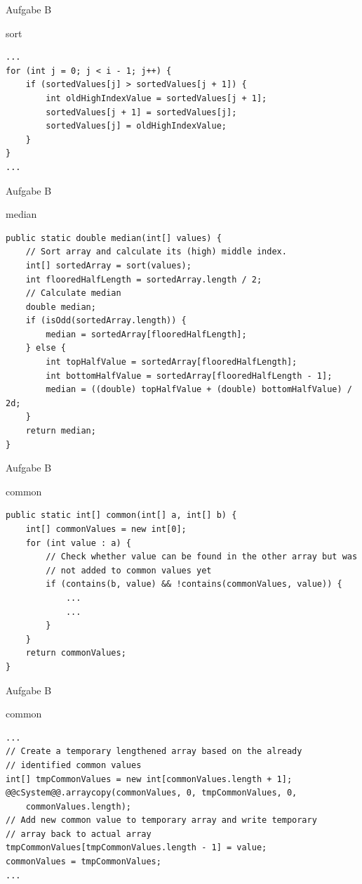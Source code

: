 \documentclass[aspectratio=169]{beamer}
\begin{document}
\begin{frame}[fragile]{Aufgabe B}
  \begin{block}{sort}
    \begin{lstlisting}
...
for (int j = 0; j < i - 1; j++) {
    if (sortedValues[j] > sortedValues[j + 1]) {
        int oldHighIndexValue = sortedValues[j + 1];
        sortedValues[j + 1] = sortedValues[j];
        sortedValues[j] = oldHighIndexValue;
    }
}
...
    \end{lstlisting}
  \end{block}
\end{frame}

\begin{frame}[fragile]{Aufgabe B}
  \begin{block}{median}
    \begin{lstlisting}
public static double median(int[] values) {
    // Sort array and calculate its (high) middle index.
    int[] sortedArray = sort(values);
    int flooredHalfLength = sortedArray.length / 2;
    // Calculate median
    double median;
    if (isOdd(sortedArray.length)) {
        median = sortedArray[flooredHalfLength];
    } else {
        int topHalfValue = sortedArray[flooredHalfLength];
        int bottomHalfValue = sortedArray[flooredHalfLength - 1];
        median = ((double) topHalfValue + (double) bottomHalfValue) / 2d;
    }
    return median;
}
    \end{lstlisting}
  \end{block}
\end{frame}

\begin{frame}[fragile]{Aufgabe B}
  \begin{block}{common}
    \begin{lstlisting}
public static int[] common(int[] a, int[] b) {
    int[] commonValues = new int[0];
    for (int value : a) {
        // Check whether value can be found in the other array but was
        // not added to common values yet
        if (contains(b, value) && !contains(commonValues, value)) {
            ...
            ...
        }
    }
    return commonValues;
}
    \end{lstlisting}
  \end{block}
\end{frame}

\begin{frame}[fragile]{Aufgabe B}
  \begin{block}{common}
    \begin{lstlisting}
...
// Create a temporary lengthened array based on the already
// identified common values
int[] tmpCommonValues = new int[commonValues.length + 1];
@@cSystem@@.arraycopy(commonValues, 0, tmpCommonValues, 0,
    commonValues.length);
// Add new common value to temporary array and write temporary
// array back to actual array
tmpCommonValues[tmpCommonValues.length - 1] = value;
commonValues = tmpCommonValues;
...
    \end{lstlisting}
  \end{block}
\end{frame}
\end{document}
